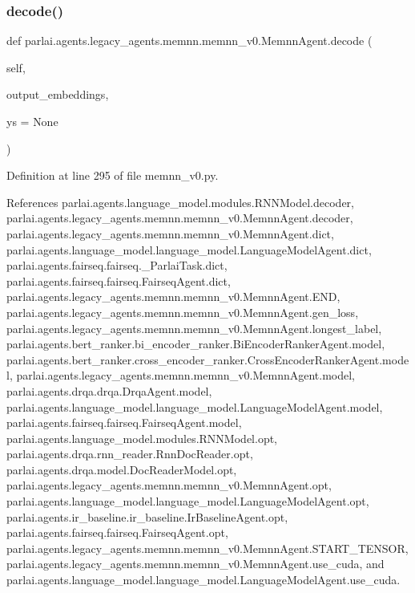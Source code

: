 \subsubsection{\texorpdfstring{decode()}{decode()}}
{\footnotesize\ttfamily def parlai.\+agents.\+legacy\+\_\+agents.\+memnn.\+memnn\+\_\+v0.\+Memnn\+Agent.\+decode (\begin{DoxyParamCaption}\item[{}]{self,  }\item[{}]{output\+\_\+embeddings,  }\item[{}]{ys = {\ttfamily None} }\end{DoxyParamCaption})}



Definition at line 295 of file memnn\+\_\+v0.\+py.



References parlai.\+agents.\+language\+\_\+model.\+modules.\+R\+N\+N\+Model.\+decoder, parlai.\+agents.\+legacy\+\_\+agents.\+memnn.\+memnn\+\_\+v0.\+Memnn\+Agent.\+decoder, parlai.\+agents.\+legacy\+\_\+agents.\+memnn.\+memnn\+\_\+v0.\+Memnn\+Agent.\+dict, parlai.\+agents.\+language\+\_\+model.\+language\+\_\+model.\+Language\+Model\+Agent.\+dict, parlai.\+agents.\+fairseq.\+fairseq.\+\_\+\+Parlai\+Task.\+dict, parlai.\+agents.\+fairseq.\+fairseq.\+Fairseq\+Agent.\+dict, parlai.\+agents.\+legacy\+\_\+agents.\+memnn.\+memnn\+\_\+v0.\+Memnn\+Agent.\+E\+ND, parlai.\+agents.\+legacy\+\_\+agents.\+memnn.\+memnn\+\_\+v0.\+Memnn\+Agent.\+gen\+\_\+loss, parlai.\+agents.\+legacy\+\_\+agents.\+memnn.\+memnn\+\_\+v0.\+Memnn\+Agent.\+longest\+\_\+label, parlai.\+agents.\+bert\+\_\+ranker.\+bi\+\_\+encoder\+\_\+ranker.\+Bi\+Encoder\+Ranker\+Agent.\+model, parlai.\+agents.\+bert\+\_\+ranker.\+cross\+\_\+encoder\+\_\+ranker.\+Cross\+Encoder\+Ranker\+Agent.\+model, parlai.\+agents.\+legacy\+\_\+agents.\+memnn.\+memnn\+\_\+v0.\+Memnn\+Agent.\+model, parlai.\+agents.\+drqa.\+drqa.\+Drqa\+Agent.\+model, parlai.\+agents.\+language\+\_\+model.\+language\+\_\+model.\+Language\+Model\+Agent.\+model, parlai.\+agents.\+fairseq.\+fairseq.\+Fairseq\+Agent.\+model, parlai.\+agents.\+language\+\_\+model.\+modules.\+R\+N\+N\+Model.\+opt, parlai.\+agents.\+drqa.\+rnn\+\_\+reader.\+Rnn\+Doc\+Reader.\+opt, parlai.\+agents.\+drqa.\+model.\+Doc\+Reader\+Model.\+opt, parlai.\+agents.\+legacy\+\_\+agents.\+memnn.\+memnn\+\_\+v0.\+Memnn\+Agent.\+opt, parlai.\+agents.\+language\+\_\+model.\+language\+\_\+model.\+Language\+Model\+Agent.\+opt, parlai.\+agents.\+ir\+\_\+baseline.\+ir\+\_\+baseline.\+Ir\+Baseline\+Agent.\+opt, parlai.\+agents.\+fairseq.\+fairseq.\+Fairseq\+Agent.\+opt, parlai.\+agents.\+legacy\+\_\+agents.\+memnn.\+memnn\+\_\+v0.\+Memnn\+Agent.\+S\+T\+A\+R\+T\+\_\+\+T\+E\+N\+S\+OR, parlai.\+agents.\+legacy\+\_\+agents.\+memnn.\+memnn\+\_\+v0.\+Memnn\+Agent.\+use\+\_\+cuda, and parlai.\+agents.\+language\+\_\+model.\+language\+\_\+model.\+Language\+Model\+Agent.\+use\+\_\+cuda.



